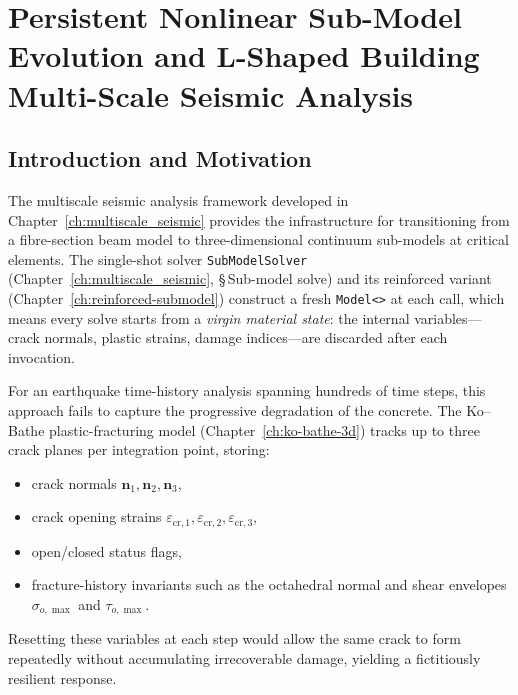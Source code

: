 
\chapter{Persistent Nonlinear Sub-Model Evolution and L-Shaped Building
         Multi-Scale Seismic Analysis}
\label{ch:nl-sub-model-evolver}


\section{Introduction and Motivation}
\label{sec:nlevo-intro}

The multiscale seismic analysis framework developed in
Chapter~\ref{ch:multiscale_seismic} provides the infrastructure for
transitioning from a fibre-section beam model to three-dimensional
continuum sub-models at critical elements.  The single-shot solver
\texttt{SubModelSolver} (Chapter~\ref{ch:multiscale_seismic},
\S\,Sub-model solve) and its reinforced variant
(Chapter~\ref{ch:reinforced-submodel}) construct a fresh
\texttt{Model<>} at each call, which
means every solve starts from a \emph{virgin material state}: the
internal variables---crack normals, plastic strains, damage
indices---are discarded after each invocation.

For an earthquake time-history analysis spanning hundreds of time steps,
this approach fails to capture the progressive degradation of the
concrete.  The Ko--Bathe plastic-fracturing model
(Chapter~\ref{ch:ko-bathe-3d}) tracks up to three crack planes per
integration point, storing:
\begin{itemize}
  \item crack normals $\mathbf{n}_1, \mathbf{n}_2, \mathbf{n}_3$,
  \item crack opening strains
        $\varepsilon_{\mathrm{cr},1}, \varepsilon_{\mathrm{cr},2},
         \varepsilon_{\mathrm{cr},3}$,
  \item open/closed status flags,
  \item fracture-history invariants such as the octahedral normal and shear
        envelopes \(\sigma_{o,\max}\) and \(\tau_{o,\max}\).
\end{itemize}
Resetting these variables at each step would allow the same crack to
form repeatedly without accumulating irrecoverable damage, yielding
a fictitiously resilient response.


